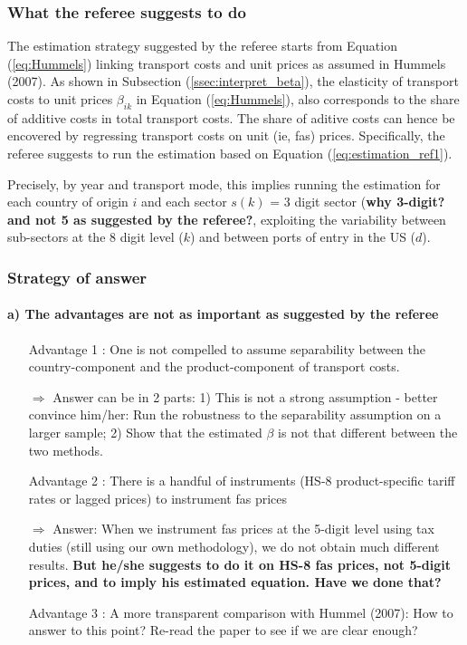 \documentclass[a4paper,12pt]{article}
\begin{document}
\subsubsection{What the referee suggests to do}

The estimation strategy suggested by the referee starts from Equation (\ref{eq:Hummels}) linking transport costs and unit prices as assumed in Hummels (2007). As shown in Subsection (\ref{ssec:interpret_beta}), the elasticity of transport costs to unit prices $\beta_{ik}$ in Equation (\ref{eq:Hummels}), also corresponds to the share of additive costs in total transport costs. The share of aditive costs can hence be encovered by regressing transport costs on unit (ie, fas) prices. Specifically, the referee suggests to run the estimation based on Equation (\ref{eq:estimation_ref1}).

Precisely, by year and transport mode, this implies running the estimation for each country of origin $i$ and each sector $s(k)$ = 3 digit sector (\textbf{why 3-digit? and not 5 as suggested by the referee?}, exploiting the variability between sub-sectors at the 8 digit level ($k$) and between ports of entry in the US ($d$).

\subsubsection{Strategy of answer}

\paragraph{a) The advantages are not as important as suggested by the referee}
\begin{itemize}
\item[Advantage 1]: One is not compelled to assume separability between the country-component and the product-component of transport costs.
\item[$\Rightarrow$] Answer can be in 2 parts: 1) This is not a strong assumption - better convince him/her: Run the robustness to the separability assumption on a larger sample; 2) Show that the estimated $\beta$ is not that different between the two methods.
\item[Advantage 2]: There is a handful of instruments (HS-8 product-specific tariff rates or lagged prices) to instrument fas prices
\item[$\Rightarrow$] Answer: When we instrument fas prices at the 5-digit level using tax duties (still using our own methodology), we do not obtain much different results. \textbf{But he/she suggests to do it on HS-8 fas prices, not 5-digit prices, and to imply his estimated equation. Have we done that?}
\item[Advantage 3]: A more transparent comparison with Hummel (2007): How to answer to this point? Re-read the paper to see if we are clear enough?
\end{itemize}
\end{document}
